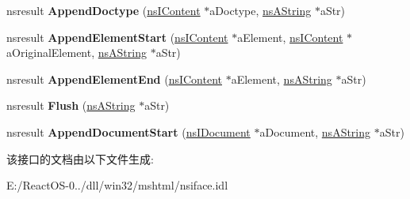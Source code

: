 \begin{DoxyCompactItemize}
nsresult {\bfseries Append\+Doctype} (\hyperlink{interfacens_i_content}{ns\+I\+Content} $\ast$a\+Doctype, \hyperlink{structns_string_container}{ns\+A\+String} $\ast$a\+Str)
\item 
\mbox{\label{interfacens_i_content_serializer_aaf13ef9eb78fdeb6e78f347ef0e6b604}} 
nsresult {\bfseries Append\+Element\+Start} (\hyperlink{interfacens_i_content}{ns\+I\+Content} $\ast$a\+Element, \hyperlink{interfacens_i_content}{ns\+I\+Content} $\ast$a\+Original\+Element, \hyperlink{structns_string_container}{ns\+A\+String} $\ast$a\+Str)
\item 
\mbox{\label{interfacens_i_content_serializer_a8d467b70ed7c1b4b21d519addac8654d}} 
nsresult {\bfseries Append\+Element\+End} (\hyperlink{interfacens_i_content}{ns\+I\+Content} $\ast$a\+Element, \hyperlink{structns_string_container}{ns\+A\+String} $\ast$a\+Str)
\item 
\mbox{\label{interfacens_i_content_serializer_a14002aeb842866fb628c18912d9bc0c0}} 
nsresult {\bfseries Flush} (\hyperlink{structns_string_container}{ns\+A\+String} $\ast$a\+Str)
\item 
\mbox{\label{interfacens_i_content_serializer_a698ee1f79e8c16d247a7d1a4b9f01308}} 
nsresult {\bfseries Append\+Document\+Start} (\hyperlink{interfacens_i_document}{ns\+I\+Document} $\ast$a\+Document, \hyperlink{structns_string_container}{ns\+A\+String} $\ast$a\+Str)
\end{DoxyCompactItemize}


该接口的文档由以下文件生成\+:\begin{DoxyCompactItemize}
\item 
E\+:/\+React\+O\+S-\/0../dll/win32/mshtml/nsiface.\+idl\end{DoxyCompactItemize}
